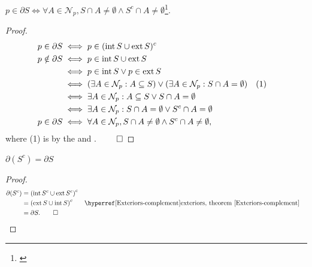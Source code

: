 \documentclass{atomic}
\begin{document}
    \begin{characterisation*} \label{characterisation}
        $p \in \partial S \iff \forall A \in \mathcal{N}_p, S \cap A \ne \emptyset \land S^c \cap A \ne \emptyset$\footnote{\label{fn:neighbourhoods}}.
    \end{characterisation*}
    \begin{proof}
        \phantom{}\vspace{-2em}
        \begin{align*}
            p \in \partial S &\iff p \in (\operatorname{int} S \cup \operatorname{ext} S)^c \\
            p \notin \partial S &\iff p \in \operatorname{int} S \cup \operatorname{ext} S \\
            &\iff p \in \operatorname{int} S \lor p \in \operatorname{ext} S \\
            &\iff \left( \exists A \in \mathcal{N}_p : A \subseteq S \right) \lor \left( \exists A \in \mathcal{N}_p : S \cap A = \emptyset \right) && (1) \\
            &\iff \exists A \in \mathcal{N}_p : A \subseteq S \lor S \cap A = \emptyset \\
            &\iff \exists A \in \mathcal{N}_p : S \cap A = \emptyset \lor S^c \cap A = \emptyset \\
            p \in \partial S &\iff \forall A \in \mathcal{N}_p, S \cap A \ne \emptyset \land S^c \cap A \ne \emptyset,
        \end{align*}
        where (1) is by the  and . $\qed$
    \end{proof}

    \begin{theorem} \label{complement}
        $\partial (S^c) = \partial S$
    \end{theorem}
    \begin{proof}
        \phantom{}\vspace{-2em}
        \begin{align*}
            \partial (S^c) &= \left( \text{int}\,S^c \cup \text{ext}\, S^c \right)^c \\
                           &= \left( \text{ext}\,S \cup \text{int}\, S \right)^c && \text{\ex[complement]{Exteriors}{exteriors, theorem} \exref[complement]{Exteriors}} \\
            &= \partial S. \qed
        \end{align*}
    \end{proof}
\end{document}
